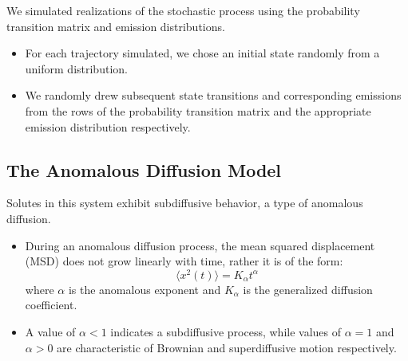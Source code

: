 \documentclass{article}
\begin{document}
  We simulated realizations of the stochastic process using the probability transition
  matrix and emission distributions.
  \begin{itemize}
    \item For each trajectory simulated, we chose an initial state randomly from a 
    uniform distribution. %
    \item We randomly drew subsequent state transitions and corresponding emissions 
    from the rows of the probability transition matrix and the appropriate emission
    distribution respectively.
  \end{itemize}
  

  \subsection{The Anomalous Diffusion Model}\label{method:model_sFBM}

  Solutes in this system exhibit subdiffusive behavior, a type of anomalous diffusion.
  \begin{itemize}
  	\item During an anomalous diffusion process, the mean squared displacement (MSD)
  	does not grow linearly with time, rather it is of the form:
	\begin{equation} 
	\langle x^2(t) \rangle = K_{\alpha}t^\alpha
	\label{eqn:msd_form}
	\end{equation} 
	where $\alpha$ is the anomalous exponent and $K_\alpha$ is the
	generalized diffusion coefficient.
	\item A value of $\alpha < 1$ indicates a subdiffusive process, while values of
	$\alpha = 1$ and $\alpha > 0$ are characteristic of Brownian and superdiffusive
	motion respectively.
  \end{itemize}
\end{document}

